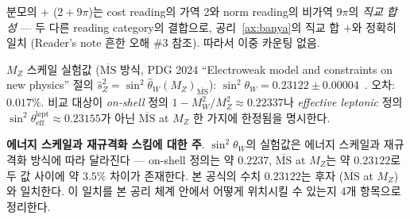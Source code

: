 \documentclass[entropy,article,submit,pdftex,oneauthor]{Definitions/mdpi}
\begin{document}
분모의 $+$ ($2 + 9\pi$)는 cost reading의 가역 2와 norm reading의 비가역 $9\pi$의 \emph{직교 합성} — 두 다른 reading category의 결합으로, 공리~\ref{ax:banya}의 직교 합 $+$와 정확히 일치 (Reader's note 흔한 오해 \#3 참조). 따라서 이중 카운팅 없음.

$M_Z$ 스케일 실험값 ($\overline{\mathrm{MS}}$ 방식, PDG 2024 ``Electroweak model and constraints on new physics'' 절의 $\hat s_Z^2 = \sin^2\hat\theta_W(M_Z)_{\overline{\mathrm{MS}}}$): $\sin^2\theta_W = 0.23122 \pm 0.00004$~\cite{pdg2024}. 오차: $\mathbf{0.017\%}$. 비교 대상이 \emph{on-shell} 정의 $1 - M_W^2/M_Z^2 \approx 0.22337$나 \emph{effective leptonic} 정의 $\sin^2\theta_{\text{eff}}^{\text{lept}} \approx 0.23155$가 아닌 $\overline{\mathrm{MS}}$ at $M_Z$ 한 가지에 한정됨을 명시한다.

\textbf{에너지 스케일과 재규격화 스킴에 대한 주}.
$\sin^2\theta_W$의 실험값은 에너지 스케일과 재규격화 방식에 따라 달라진다 — on-shell 정의는 약 $0.2237$, $\overline{\mathrm{MS}}$ at $M_Z$는 약 $0.23122$로 두 값 사이에 약 $3.5\%$ 차이가 존재한다. 본 공식의 수치 $0.23122$는 후자 ($\overline{\mathrm{MS}}$ at $M_Z$)와 일치한다. 이 일치를 본 공리 체계 안에서 어떻게 위치시킬 수 있는지 4개 항목으로 정리한다.
\end{document}
